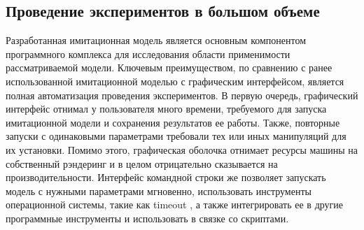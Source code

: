 \subsection{Проведение экспериментов в большом объеме}
Разработанная имитационная модель является основным компонентом программного комплекса для исследования области применимости рассматриваемой модели. Ключевым преимуществом, по сравнению с ранее использованной имитационной моделью \cite{evm} с графическим интерфейсом, является полная автоматизация проведения экспериментов. В первую очередь, графический интерфейс отнимал у пользователя много времени, требуемого для запуска имитационной модели и сохранения результатов ее работы. Также, повторные запуски с одинаковыми параметрами требовали тех или иных манипуляций для их установки. Помимо этого, графическая оболочка отнимает ресурсы машины на собственный рэндеринг и в целом отрицательно сказывается на производительности. Интерфейс командной строки же позволяет запускать модель с нужными параметрами мгновенно, использовать инструменты операционной системы, такие как timeout \cite{taylor2004wicked}, а также интегрировать ее в другие программные инструменты и использовать в связке со скриптами.

